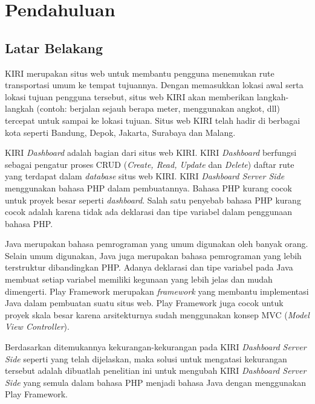 \chapter{Pendahuluan}
\label{chap:pendahuluan}

\section{Latar Belakang}
\label{sec:latar_belakang}
KIRI\cite{kiritravel} merupakan situs web untuk membantu pengguna menemukan rute transportasi umum ke tempat tujuannya. Dengan memasukkan lokasi awal serta lokasi tujuan pengguna tersebut, situs web KIRI akan memberikan langkah-langkah (contoh: berjalan sejauh berapa meter, menggunakan angkot, dll) tercepat untuk sampai ke lokasi tujuan. Situs web KIRI telah hadir di berbagai kota seperti Bandung, Depok, Jakarta, Surabaya dan Malang.

KIRI \textit{Dashboard}\cite{devkiritravel} adalah bagian dari situs web KIRI. KIRI \textit{Dashboard} berfungsi sebagai pengatur proses CRUD (\textit{Create, Read, Update} dan \textit{Delete}) daftar rute yang terdapat dalam \textit{database} situs web KIRI. KIRI \textit{Dashboard Server Side} menggunakan bahasa PHP dalam pembuatannya\cite{kiridashboard}. Bahasa PHP kurang cocok untuk proyek besar seperti \textit{dashboard}. Salah satu penyebab bahasa PHP kurang cocok adalah karena tidak ada deklarasi dan tipe variabel dalam penggunaan bahasa PHP.

Java merupakan bahasa pemrograman yang umum digunakan oleh banyak orang. Selain umum digunakan, Java juga merupakan bahasa pemrograman yang lebih terstruktur dibandingkan PHP. Adanya deklarasi dan tipe variabel pada Java membuat setiap variabel memiliki kegunaan yang lebih jelas dan mudah dimengerti. Play Framework merupakan \textit{framework} yang membantu implementasi Java dalam pembuatan suatu situs web. Play Framework juga cocok untuk proyek skala besar karena arsitekturnya sudah menggunakan konsep MVC (\textit{Model View Controller})\cite{playforjava}.

Berdasarkan ditemukannya kekurangan-kekurangan pada KIRI \textit{Dashboard Server Side} seperti yang telah dijelaskan, maka solusi untuk mengatasi kekurangan tersebut adalah dibuatlah penelitian ini untuk mengubah KIRI \textit{Dashboard Server Side} yang semula dalam bahasa PHP menjadi bahasa Java dengan menggunakan Play Framework.

